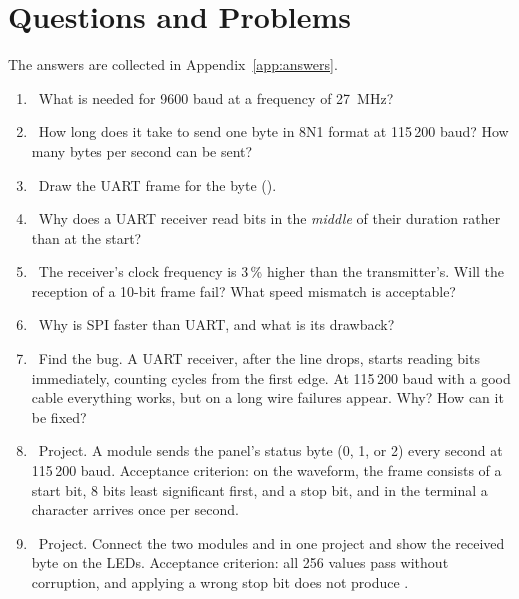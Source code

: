 \section{Questions and Problems}
\label{sec:tasks-uart}

The answers are collected in Appendix~\ref{app:answers}.

\begin{taskbox}
\begin{enumerate}
  \item {}~What  is needed for 9600 baud at a frequency of 27~MHz?
  \item {}~How long does it take to send one byte in 8N1 format at
        115\,200 baud? How many bytes per second can be sent?
  \item {}~Draw the UART frame for the byte  ().
  \item {}~Why does a UART receiver read bits in the \emph{middle} of their duration rather than at the start?
  \item {}~The receiver's clock frequency is 3\,\% higher than the transmitter's. Will the
        reception of a 10-bit frame fail? What speed mismatch is acceptable?
  \item {}~Why is SPI faster than UART, and what is its drawback?
  \item {}~Find the bug. A UART receiver, after the line drops, starts reading bits immediately, counting
         cycles from the first edge. At 115\,200 baud with a good
        cable everything works, but on a long wire failures appear. Why? How can it be fixed?
  \item {}~Project. A module sends the panel's status byte (0, 1, or 2) every second
        at 115\,200 baud. Acceptance criterion: on the waveform, the frame consists of
        a start bit, 8 bits least significant first, and a stop bit, and in the terminal a character arrives once per second.
  \item {}~Project. Connect the two modules  and  in one project
        and show the received byte on the LEDs. Acceptance criterion: all 256 values pass
        without corruption, and applying a wrong stop bit does not produce .
\end{enumerate}
\end{taskbox}
